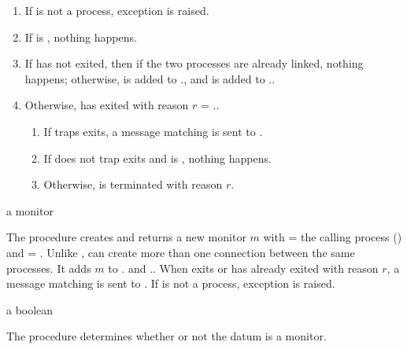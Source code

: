 \begin{enumerate}
\item If  is not a process, exception  is raised.
\item If  is , nothing happens.
\item If  has not exited, then if the two processes are
  already linked, nothing happens; otherwise,  is added to
  ., and  is added to
  ..
\item Otherwise,  has exited with reason $r$ =
  ..
  \begin{enumerate}
  \item If  traps exits, a message matching 
    is sent to .
  \item If  does not trap exits and  is ,
    nothing happens.
  \item Otherwise,  is terminated with reason $r$.
  \end{enumerate}
\end{enumerate}

\begin{procedure}
\end{procedure}
\returns{} a monitor

The  procedure creates and returns a new monitor $m$
with  = the calling process () and
 = .  Unlike ,
 can create more than one connection between the same
processes.  It adds $m$ to . and
..  When  exits or has
already exited with reason $r$, a message matching
 is sent to .
If  is not
a process, exception  is
raised.

\begin{procedure}
\end{procedure}
\returns{} a boolean

The  procedure determines whether or not the datum
 is a monitor.


